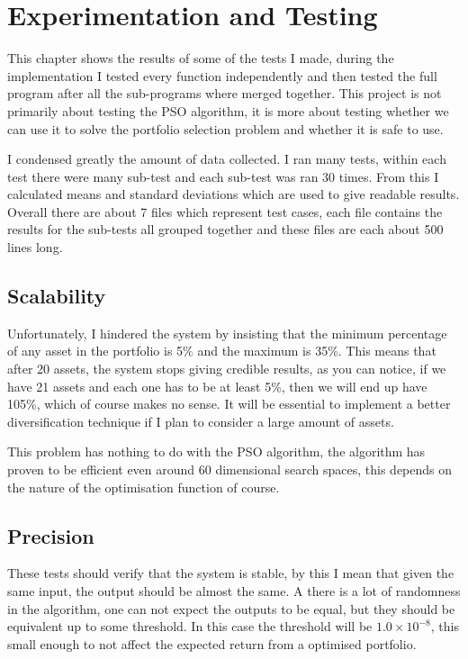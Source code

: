\chapter{Experimentation and Testing}
This chapter shows the results of some of the tests I made, during the implementation I tested every function independently and then tested the full program after all the sub-programs where merged together. This project is not primarily about testing the PSO algorithm, it is more about testing whether we can use it to solve the portfolio selection problem and whether it is safe to use. 

I condensed greatly the amount of data collected. I ran many tests, within each test there were many sub-test and each sub-test was ran 30 times. From this I calculated means and standard deviations which are used to give readable results. Overall there are about 7 files which represent test cases, each file contains the results for the sub-tests all grouped together and these files are each about 500 lines long.  
  \section{Scalability} %
  \label{sec:scalability}
    Unfortunately, I hindered the system by insisting that the minimum percentage of any asset in the portfolio is 5\% and the maximum is 35\%. This means that after 20 assets, the system stops giving credible results, as you can notice, if we have 21 assets and each one has to be at least 5\%, then we will end up have 105\%, which of course makes no sense. It will be essential to implement a better diversification technique if I plan to consider a large amount of assets. 

    This problem has nothing to do with the PSO algorithm, the algorithm has proven to be efficient even around 60 dimensional search spaces, this depends on the nature of the optimisation function of course. 

  \section{Precision} %
  \label{sec:precision}
  These tests should verify that the system is stable, by this I mean that given the same input, the output should be almost the same. A there is a lot of randomness in the algorithm, one can not expect the outputs to be equal, but they should be equivalent up to some threshold. In this case the threshold will be $1.0\times10^{-8}$, this small enough to not affect the expected return from a optimised portfolio. 

